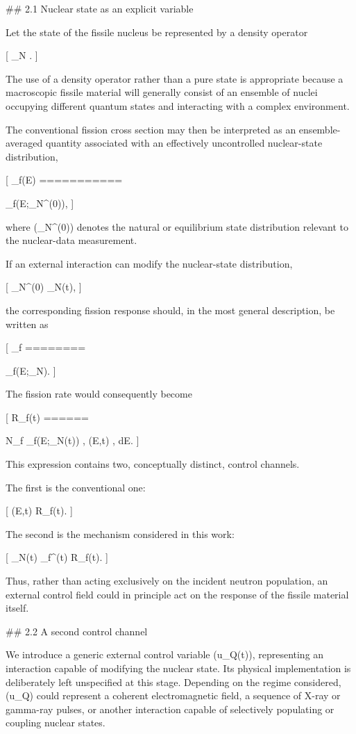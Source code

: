 ## 2.1 Nuclear state as an explicit variable

Let the state of the fissile nucleus be represented by a density operator

[
\rho_N .
]

The use of a density operator rather than a pure state is appropriate because a macroscopic fissile material will generally consist of an ensemble of nuclei occupying different quantum states and interacting with a complex environment.

The conventional fission cross section may then be interpreted as an ensemble-averaged quantity associated with an effectively uncontrolled nuclear-state distribution,

[
\sigma_f(E)
===========

\sigma_f(E;\rho_N^{(0)}),
]

where (\rho_N^{(0)}) denotes the natural or equilibrium state distribution relevant to the nuclear-data measurement.

If an external interaction can modify the nuclear-state distribution,

[
\rho_N^{(0)}
\rightarrow
\rho_N(t),
]

the corresponding fission response should, in the most general description, be written as

[
\sigma_f
========

\sigma_f(E;\rho_N).
]

The fission rate would consequently become

[
R_f(t)
======

N_f
\int
\sigma_f(E;\rho_N(t))
,
\Phi(E,t)
,
dE.
]

This expression contains two, conceptually distinct, control channels.

The first is the conventional one:

[
\Phi(E,t)
\rightarrow
R_f(t).
]

The second is the mechanism considered in this work:

[
\rho_N(t)
\rightarrow
\sigma_f^{}(t)
\rightarrow
R_f(t).
]

Thus, rather than acting exclusively on the incident neutron population, an external control field could in principle act on the response of the fissile material itself.

## 2.2 A second control channel

We introduce a generic external control variable (u_Q(t)), representing an interaction capable of modifying the nuclear state. Its physical implementation is deliberately left unspecified at this stage. Depending on the regime considered, (u_Q) could represent a coherent electromagnetic field, a sequence of X-ray or gamma-ray pulses, or another interaction capable of selectively populating or coupling nuclear states.

